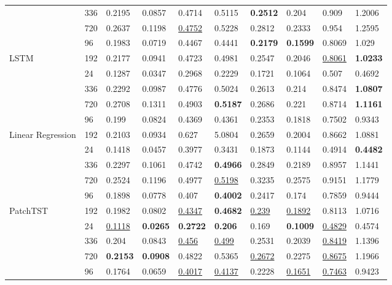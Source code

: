 \begin{tabular}{llllllllll}
 & 336 & 0.2195 & 0.0857 & 0.4714 & 0.5115 & \textbf{0.2512} & 0.204 & 0.909 & 1.2006 \\
 & 720 & 0.2637 & 0.1198 & \underline{0.4752} & 0.5228 & 0.2812 & 0.2333 & 0.954 & 1.2595 \\
 & 96 & 0.1983 & 0.0719 & 0.4467 & 0.4441 & \textbf{0.2179} & \textbf{0.1599} & 0.8069 & 1.029 \\
\cline{1-10}
\multirow[t]{5}{*}{LSTM} & 192 & 0.2177 & 0.0941 & 0.4723 & 0.4981 & 0.2547 & 0.2046 & \underline{0.8061} & \textbf{1.0233} \\
 & 24 & 0.1287 & 0.0347 & 0.2968 & 0.2229 & 0.1721 & 0.1064 & 0.507 & 0.4692 \\
 & 336 & 0.2292 & 0.0987 & 0.4776 & 0.5024 & 0.2613 & 0.214 & 0.8474 & \textbf{1.0807} \\
 & 720 & 0.2708 & 0.1311 & 0.4903 & \textbf{0.5187} & 0.2686 & 0.221 & 0.8714 & \textbf{1.1161} \\
 & 96 & 0.199 & 0.0824 & 0.4369 & 0.4361 & 0.2353 & 0.1818 & 0.7502 & 0.9343 \\
\cline{1-10}
\multirow[t]{5}{*}{Linear Regression} & 192 & 0.2103 & 0.0934 & 0.627 & 5.0804 & 0.2659 & 0.2004 & 0.8662 & 1.0881 \\
 & 24 & 0.1418 & 0.0457 & 0.3977 & 0.3431 & 0.1873 & 0.1144 & 0.4914 & \textbf{0.4482} \\
 & 336 & 0.2297 & 0.1061 & 0.4742 & \textbf{0.4966} & 0.2849 & 0.2189 & 0.8957 & 1.1441 \\
 & 720 & 0.2524 & 0.1196 & 0.4977 & \underline{0.5198} & 0.3235 & 0.2575 & 0.9151 & 1.1779 \\
 & 96 & 0.1898 & 0.0778 & 0.407 & \textbf{0.4002} & 0.2417 & 0.174 & 0.7859 & 0.9444 \\
\cline{1-10}
\multirow[t]{5}{*}{PatchTST} & 192 & 0.1982 & 0.0802 & \underline{0.4347} & \textbf{0.4682} & \underline{0.239} & \underline{0.1892} & 0.8113 & 1.0716 \\
 & 24 & \underline{0.1118} & \textbf{0.0265} & \textbf{0.2722} & \textbf{0.206} & 0.169 & \textbf{0.1009} & \underline{0.4829} & 0.4574 \\
 & 336 & 0.204 & 0.0843 & \underline{0.456} & \underline{0.499} & 0.2531 & 0.2039 & \underline{0.8419} & 1.1396 \\
 & 720 & \textbf{0.2153} & \textbf{0.0908} & 0.4822 & 0.5365 & \underline{0.2672} & 0.2275 & \underline{0.8675} & 1.1966 \\
 & 96 & 0.1764 & 0.0659 & \underline{0.4017} & \underline{0.4137} & 0.2228 & \underline{0.1651} & \underline{0.7463} & 0.9423 \\

\end{tabular}
